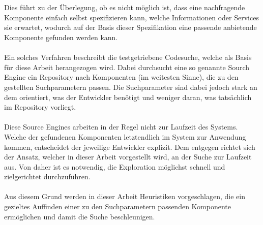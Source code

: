 \\\\
Dies führt zu der Überlegung, ob es nicht möglich ist, dass eine nachfragende Komponente einfach selbst spezifizieren kann, welche Informationen oder Services sie erwartet, wodurch auf der Basis dieser Spezifikation eine passende anbietende Komponente gefunden werden kann.
\\\\
Ein solches Verfahren beschreibt die testgetriebene Codesuche, welche als Basis für diese Arbeit herangezogen wird. Dabei durchsucht eine so genannte Sourch Engine ein Repository nach Komponenten (im weitesten Sinne), die zu den gestellten Suchparametern passen. Die Suchparameter sind dabei jedoch stark an dem orientiert, was der Entwickler benötigt und weniger daran, was tatsächlich im Repository vorliegt.
\\\\
Diese Source Engines arbeiten in der Regel nicht zur Laufzeit des Systems. Welche der gefundenen Komponenten letztendlich im System zur Anwendung kommen, entscheidet der jeweilige Entwickler explizit. Dem entgegen richtet sich der Ansatz, welcher in dieser Arbeit vorgestellt wird, an der Suche zur Laufzeit aus. Von daher ist es notwendig, die Exploration möglichst schnell und zielgerichtet durchzuführen.
\\\\
Aus diesem Grund werden in dieser Arbeit Heuristiken vorgeschlagen, die ein gezieltes Auffinden einer zu den Suchparametern passenden Komponente ermöglichen und damit die Suche beschleunigen.

